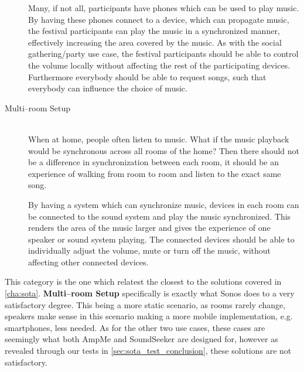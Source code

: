 \begin{description}
        Many, if not all, participants have phones which can be used to play music.
        By having these phones connect to a device, which can propagate music,
        the festival participants can play the music in a synchronized manner,
        effectively increasing the area covered by the music.
        As with the social gathering/party use case,
        the festival participants should be able to control the volume locally without affecting the rest of the participating devices.
        Furthermore everybody should be able to request songs, such that everybody can influence the choice of music.

    \item[Multi--room Setup] \hfill\\
        When at home, people often listen to music.
        What if the music playback would be synchronous across all rooms of the home?
        Then there should not be a difference in synchronization between each room,
        it should be an experience of walking from room to room and listen to the exact same song.

        By having a system which can synchronize music, devices in each room can be connected to the sound system and play the music synchronized.
        This renders the area of the music larger and gives the experience of one speaker or sound system playing.
        The connected devices should be able to individually adjust the volume, mute or turn off the music,
        without affecting other connected devices. 
\end{description}

This category is the one which relatest the closest to the solutions covered in \cref{cha:sota}.
\textbf{Multi--room Setup} specifically is exactly what Sonos does to a very satisfactory degree.
This being a more static scenario, as rooms rarely change, speakers make sense in this scenario making a more mobile implementation, e.g. smartphones, less needed.
As for the other two use cases, these cases are seemingly what both AmpMe and SoundSeeker are designed for, however as revealed through our tests in \cref{sec:sota_test_conclusion}, these solutions are not satisfactory.
